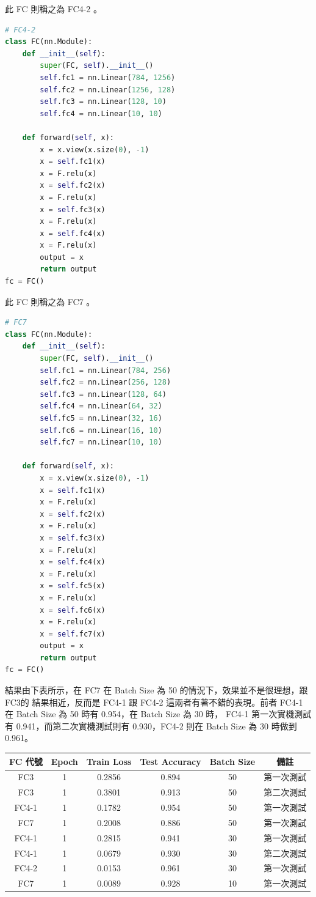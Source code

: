 \documentclass[11pt,UTF8]{ctexart}
\begin{document}
此 FC 則稱之為 FC4-2 。

	\begin{lstlisting}[language={python}]
# FC4-2
class FC(nn.Module):
    def __init__(self):
        super(FC, self).__init__()
        self.fc1 = nn.Linear(784, 1256)
        self.fc2 = nn.Linear(1256, 128)
        self.fc3 = nn.Linear(128, 10)
        self.fc4 = nn.Linear(10, 10)

    def forward(self, x):
        x = x.view(x.size(0), -1)
        x = self.fc1(x)
        x = F.relu(x)
        x = self.fc2(x)
        x = F.relu(x)
        x = self.fc3(x)
        x = F.relu(x)
        x = self.fc4(x)
        x = F.relu(x)
        output = x
        return output
fc = FC()
	\end{lstlisting}

此 FC 則稱之為 FC7 。

	\begin{lstlisting}[language={python}]
# FC7
class FC(nn.Module):
    def __init__(self):
        super(FC, self).__init__()
        self.fc1 = nn.Linear(784, 256)
        self.fc2 = nn.Linear(256, 128)
        self.fc3 = nn.Linear(128, 64)
        self.fc4 = nn.Linear(64, 32)
        self.fc5 = nn.Linear(32, 16)
        self.fc6 = nn.Linear(16, 10)
        self.fc7 = nn.Linear(10, 10)

    def forward(self, x):
        x = x.view(x.size(0), -1)
        x = self.fc1(x)
        x = F.relu(x)
        x = self.fc2(x)
        x = F.relu(x)
        x = self.fc3(x)
        x = F.relu(x)
        x = self.fc4(x)
        x = F.relu(x)
        x = self.fc5(x)
        x = F.relu(x)
        x = self.fc6(x)
        x = F.relu(x)
        x = self.fc7(x)
        output = x
        return output
fc = FC()
	\end{lstlisting}
	
結果由下表所示，在 FC7 在 Batch Size 為 50 的情況下，效果並不是很理想，跟 FC3的 結果相近，反而是 FC4-1 跟 FC4-2 這兩者有著不錯的表現。前者 FC4-1 在 Batch Size 為 50 時有 0.954，在 Batch Size 為 30 時， FC4-1 第一次實機測試有 0.941，而第二次實機測試則有 0.930，FC4-2 則在 Batch Size 為 30 時做到 0.961。

\begin{center}
\begin{tabular}{cccccc}
\hline
FC 代號 & Epoch & Train Loss & Test Accuracy & Batch Size & 備註 \\
\hline
FC3 & 1 & 0.2856 & 0.894 & 50 & 第一次測試 \\
FC3 & 1 & 0.3801 & 0.913 & 50 & 第二次測試  \\
FC4-1 & 1 & 0.1782 & 0.954  & 50 &第一次測試 \\
FC7 & 1 & 0.2008 & 0.886 & 50 & 第一次測試 \\
FC4-1 & 1 & 0.2815 & 0.941 & 30 & 第一次測試 \\
FC4-1 & 1 & 0.0679 & 0.930 & 30 & 第二次測試 \\
FC4-2 & 1 & 0.0153 & 0.961 & 30 & 第一次測試 \\
FC7 & 1 & 0.0089 & 0.928 & 10 & 第一次測試 \\
\hline
\end{tabular}
\end{center}
\end{document}
